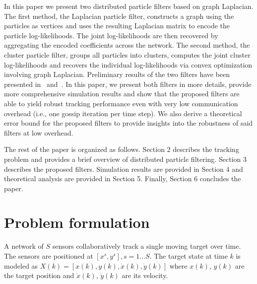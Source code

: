 \documentclass[10pt,letterpaper,final]{article}
\begin{document}

In this paper we present two distributed particle filters based on graph Laplacian. The first method, the Laplacian particle filter, constructs a graph using the particles as vertices and uses the resulting Laplacian matrix to encode the particle log-likelihoods. The joint log-likelihoods are then recovered by aggregating the encoded coefficients across the network. The second method, the cluster particle filter, groups all particles into clusters, computes the joint cluster log-likelihoods and recovers the individual log-likelihoods via convex optimization involving graph Laplacian. Preliminary results of the two filters have been presented in~\cite{Rabbat2016} and~\cite{Mohammadi2012}. In this paper, we present both filters in more details, provide more comprehensive simulation results and show that the proposed filters are able to yield robust tracking performance even with very low communication overhead (i.e., one gossip iteration per time step). We also derive a theoretical error bound for the proposed filters to provide insights into the robustness of said filters at low overhead. 

The rest of the paper is organized as follows. Section 2 describes the tracking problem and provides a brief overview of distributed particle filtering. Section 3 describes the proposed filters. Simulation results are provided in Section 4 and theoretical analysis are provided in Section 5. Finally, Section 6 concludes the paper. 

\section{Problem formulation}
A network of $S$ sensors collaboratively track a single moving target over time. The sensors are positioned at $[x^s, y^s], s=1...S$. The target state at time $k$ is modeled as $X(k) = [x(k),y(k), \dot{x}(k), \dot{y}(k)]$ where $x(k)$, $y(k)$ are the target position and $\dot{x}(k)$, $\dot{y}(k)$ are its velocity. 
\end{document}
